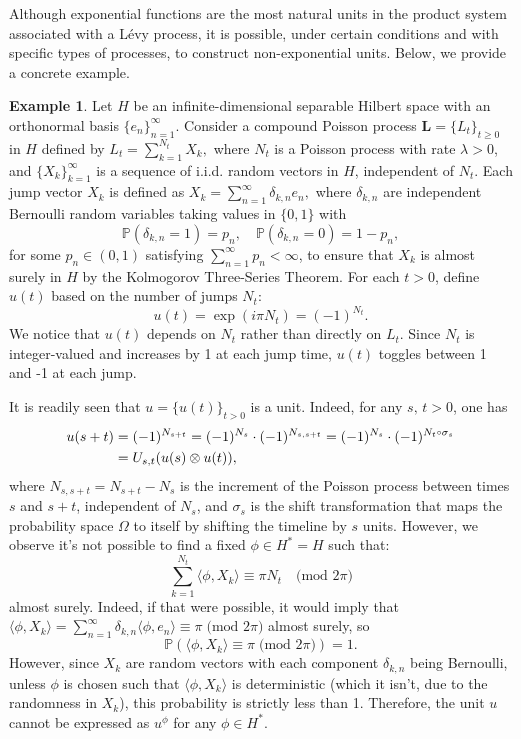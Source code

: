 \documentclass[11pt]{amsart}
\theoremstyle{definition}
\newtheorem{example}[theorem]{Example}
\theoremstyle{remark}
\numberwithin{equation}{section}
\newcommand{\compcent}[1]{\vcenter{\hbox{$#1\circ$}}}
\newcommand{\comp}{\mathbin{\mathchoice
{\compcent\scriptstyle}{\compcent\scriptstyle}
{\compcent\scriptscriptstyle}{\compcent\scriptscriptstyle}}}
\begin{document}
Although exponential functions are the most natural units in the product system associated with a L\'evy process, it is possible, under certain conditions and with specific types of processes, to construct non-exponential units. Below, we provide a concrete example.

\begin{example}\label{exm1}
    Let \(H\) be an infinite-dimensional separable Hilbert space with an orthonormal basis \(\{ e_n \}_{n=1}^\infty\). Consider a compound Poisson process \(\bm{L} = \{ L_t \}_{t \geq 0}\) in \(H\) defined by
    \(
    L_t = \sum_{k=1}^{N_t} X_k,
    \)
    where \(N_t\) is a Poisson process with rate \(\lambda > 0\), and \(\{ X_k \}_{k=1}^\infty\) is a sequence of i.i.d. random vectors in \(H\), independent of \(N_t\). Each jump vector \(X_k\) is defined as 
    \(
    X_k = \sum_{n=1}^\infty \delta_{k,n} e_n,
    \)
where \(\delta_{k,n}\) are independent Bernoulli random variables taking values in \(\{0,1\}\) with 
    \[
    \mathbb{P}(\delta_{k,n} = 1) = p_n,\quad \mathbb{P}(\delta_{k,n} = 0) = 1 - p_n,
    \] for some \(p_n\in (0,1)\) satisfying \(\sum_{n=1}^\infty p_n < \infty\), to ensure that \(X_k\) is almost surely in \(H\) by the Kolmogorov Three-Series Theorem. For each \(t>0\), define \(u(t)\) based on the number of jumps \(N_t\):
    \[
    u(t) = \exp(i\pi N_t) = (-1)^{N_t}.
    \]
    We notice that \(u(t)\) depends on \(N_t\) rather than directly on \(L_t\). Since \(N_t\) is integer-valued and increases by 1 at each jump time, \(u(t)\) toggles between 1 and -1 at each jump. 
    
It is readily seen that \(u=\{u(t)\}_{t>0}\) is a unit. Indeed, for any \(s,\,t>0\), one has \begin{align*}
u(s + t) &= (-1)^{N_{s + t}} = (-1)^{N_s} \cdot (-1)^{N_{s, s + t}}=(-1)^{N_s} \cdot (-1)^{N_{t}\comp\sigma_s}\\&=U_{s, t}(u(s) \otimes u(t)),\end{align*}
 where \(N_{s, s + t} = N_{s + t} - N_s\) is the increment of the Poisson process between times \(s\) and \(s + t\), independent of \(N_s\), and \(\sigma_s\) is the shift transformation that maps the probability space \(\Omega\) to itself by shifting the timeline by \(s\) units.
However, we observe it's not possible to find a fixed \(\phi \in H^*=H\) such that:
    \[
    \sum_{k=1}^{N_t} \langle \phi, X_k \rangle \equiv \pi N_t \quad \text{(mod } 2\pi\text{)} 
    \]
    almost surely. Indeed, if that were possible, it would imply that \(
    \langle \phi, X_k \rangle =\sum_{n=1}^\infty\delta_{k,n} \langle \phi, e_n \rangle \equiv \pi \; \text{(mod } 2\pi\text{)}\)
    almost surely, so 
    \[
    \mathbb{P}\left( \langle \phi, X_k \rangle \equiv \pi \; \text{(mod } 2\pi\text{)} \right) = 1.
    \]
    However, since \(X_k\) are random vectors with each component \(\delta_{k,n}\) being Bernoulli, unless \(\phi\) is chosen such that \( \langle \phi, X_k \rangle \) is deterministic (which it isn't, due to the randomness in \(X_k\)), this probability is strictly less than 1. Therefore, the unit \(u\) cannot be expressed as \(u^\phi\) for any \(\phi \in H^*\).
\end{example}
\end{document}
